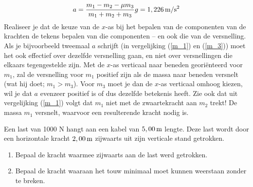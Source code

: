 \begin{exercise}
\begin{oplossing}
\begin{eqnarray*}
a=\frac{m_1-m_2-\mu m_3}{m_1+m_2+m_3}g=1,226\rm\,m/s^2
\end{eqnarray*}
\newline
\newline
Realiseer je dat de keuze van de $x$-as bij het bepalen van de componenten van de krachten de tekens bepalen van die componenten -- en ook die van de versnelling. Als je bijvoorbeeld tweemaal $a$ schrijft (in vergelijking (\ref{m_1}) en (\ref{m_3})) moet het ook effectief over dezelfde versnelling gaan, en niet over versnellingen die elkaars tegengestelde zijn. Met de $x$-as verticaal naar beneden geori\"enteerd voor $m_1$, zal de versnelling voor $m_1$ positief zijn als de massa naar beneden versnelt (wat hij doet; $m_1>m_3$). Voor $m_3$ moet je dan de $x$-as verticaal omhoog kiezen, wil je dat $a$ evenzeer positief is of dus dezelfde betekenis heeft.
\newline
\newline
Zie ook dat uit vergelijking (\ref{m_1}) volgt dat $m_1$ niet met de zwaartekracht aan $m_2$ trekt! De massa $m_1$ versnelt, waarvoor een resulterende kracht nodig is. 
\end{oplossing}



\end{exercise}

\begin{exercise} Een last van 1000 N hangt aan een kabel van $5,00\rm\,m$
lengte. Deze last wordt door een horizontale kracht $2,00\rm\,m$
zijwaarts uit zijn verticale stand getrokken.
\begin{enumerate}
    \item Bepaal de kracht waarmee zijwaarts aan de last werd
    getrokken.
    \item Bepaal de kracht waaraan het touw minimaal moet kunnen
    weerstaan zonder te breken.
\end{enumerate}


\end{exercise}

